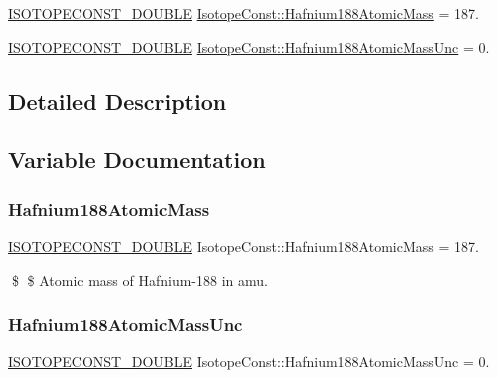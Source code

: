 \begin{DoxyCompactItemize}
\item 
\mbox{\hyperlink{group___isotope_const-_macros_ga8f45a7272ce02c0b4c65c44636ed719a}{I\+S\+O\+T\+O\+P\+E\+C\+O\+N\+S\+T\+\_\+\+D\+O\+U\+B\+LE}} \mbox{\hyperlink{group___isotope_const-_hafnium-_hf188_ga3944e426d2e9ec4fb1b2de5563418e25}{Isotope\+Const\+::\+Hafnium188\+Atomic\+Mass}} = 187.
\item 
\mbox{\hyperlink{group___isotope_const-_macros_ga8f45a7272ce02c0b4c65c44636ed719a}{I\+S\+O\+T\+O\+P\+E\+C\+O\+N\+S\+T\+\_\+\+D\+O\+U\+B\+LE}} \mbox{\hyperlink{group___isotope_const-_hafnium-_hf188_gaa54b79dd23a3ffa67320a6d6622349bf}{Isotope\+Const\+::\+Hafnium188\+Atomic\+Mass\+Unc}} = 0.
\end{DoxyCompactItemize}


\subsection{Detailed Description}


\subsection{Variable Documentation}
\mbox{\label{group___isotope_const-_hafnium-_hf188_ga3944e426d2e9ec4fb1b2de5563418e25}} 
\subsubsection{\texorpdfstring{Hafnium188\+Atomic\+Mass}{Hafnium188AtomicMass}}
{\footnotesize\ttfamily \mbox{\hyperlink{group___isotope_const-_macros_ga8f45a7272ce02c0b4c65c44636ed719a}{I\+S\+O\+T\+O\+P\+E\+C\+O\+N\+S\+T\+\_\+\+D\+O\+U\+B\+LE}} Isotope\+Const\+::\+Hafnium188\+Atomic\+Mass = 187.}

\$ \$ Atomic mass of Hafnium-\/188 in amu. \mbox{\label{group___isotope_const-_hafnium-_hf188_gaa54b79dd23a3ffa67320a6d6622349bf}} 
\subsubsection{\texorpdfstring{Hafnium188\+Atomic\+Mass\+Unc}{Hafnium188AtomicMassUnc}}
{\footnotesize\ttfamily \mbox{\hyperlink{group___isotope_const-_macros_ga8f45a7272ce02c0b4c65c44636ed719a}{I\+S\+O\+T\+O\+P\+E\+C\+O\+N\+S\+T\+\_\+\+D\+O\+U\+B\+LE}} Isotope\+Const\+::\+Hafnium188\+Atomic\+Mass\+Unc = 0.}

